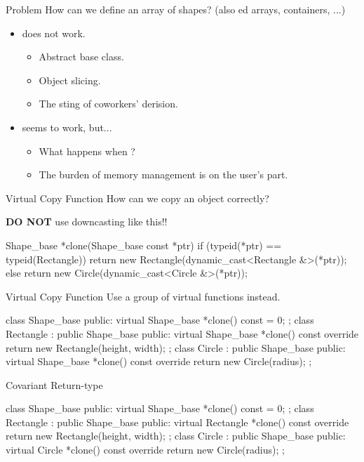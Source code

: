 \documentclass{beamer}
\begin{document}
\begin{frame}{Problem}
    How can we define an array of shapes? (also ed arrays, containers, ...)
    \begin{itemize}
        \item {} does not work.
        \begin{itemize}
            \item Abstract base class.
            \item Object slicing.
            \item The sting of coworkers' derision.
        \end{itemize}
        \item {} seems to work, but...
        \begin{itemize}
            \item What happens when ?
            \item The burden of memory management is on the user's part.
        \end{itemize}
    \end{itemize}
\end{frame}

\begin{frame}[fragile]{Virtual Copy Function}
    How can we copy an object correctly?\par
    \pause
    \textbf{DO NOT} use downcasting like this!!
    \begin{cpp}
Shape_base *clone(Shape_base const *ptr) {
  if (typeid(*ptr) == typeid(Rectangle))
    return new Rectangle(dynamic_cast<Rectangle &>(*ptr));
  else
    return new Circle(dynamic_cast<Circle &>(*ptr));
}
    \end{cpp}
\end{frame}

\begin{frame}[fragile]{Virtual Copy Function}
    Use a group of virtual functions instead.
    \begin{cpp}
class Shape_base {
 public:
  virtual Shape_base *clone() const = 0;
};
class Rectangle : public Shape_base {
 public:
  virtual Shape_base *clone() const override
    { return new Rectangle(height, width); }
};
class Circle : public Shape_base {
 public:
  virtual Shape_base *clone() const override
    { return new Circle(radius); }
};
    \end{cpp}
\end{frame}

\begin{frame}[fragile]{Covariant Return-type}
    \begin{cpp}
class Shape_base {
 public:
  virtual Shape_base *clone() const = 0;
};
class Rectangle : public Shape_base {
 public:
  virtual Rectangle *clone() const override
    { return new Rectangle(height, width); }
};
class Circle : public Shape_base {
 public:
  virtual Circle *clone() const override
    { return new Circle(radius); }
};
    \end{cpp}
\end{frame}
\end{document}
